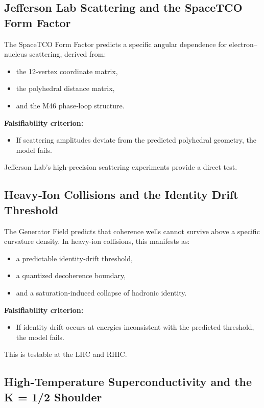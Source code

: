 \documentclass[reprint,amsmath,amssymb,aps,prl,floatfix]{revtex4-2}
\begin{document}
\begin{itemize}
\subsection{Jefferson Lab Scattering and the SpaceTCO Form Factor}

The SpaceTCO Form Factor predicts a specific angular dependence for electron–nucleus scattering, derived from:
\begin{itemize}
\item the 12‑vertex coordinate matrix,  
\item the polyhedral distance matrix,  
\item and the M46 phase‑loop structure.
\end{itemize}

\textbf{Falsifiability criterion:}
\begin{itemize}
\item If scattering amplitudes deviate from the predicted polyhedral geometry, the model fails.
\end{itemize}

Jefferson Lab’s high‑precision scattering experiments provide a direct test.

\subsection{Heavy‑Ion Collisions and the Identity Drift Threshold}

The Generator Field predicts that coherence wells cannot survive above a specific curvature density. In heavy‑ion collisions, this manifests as:

\begin{itemize}
\item a predictable identity‑drift threshold,  
\item a quantized decoherence boundary,  
\item and a saturation‑induced collapse of hadronic identity.
\end{itemize}

\textbf{Falsifiability criterion:}

\begin{itemize}
\item If identity drift occurs at energies inconsistent with the predicted threshold, the model fails.
\end{itemize}

This is testable at the LHC and RHIC.

\subsection{High‑Temperature Superconductivity and the K = 1/2 Shoulder}


\end{itemize}
\end{document}
